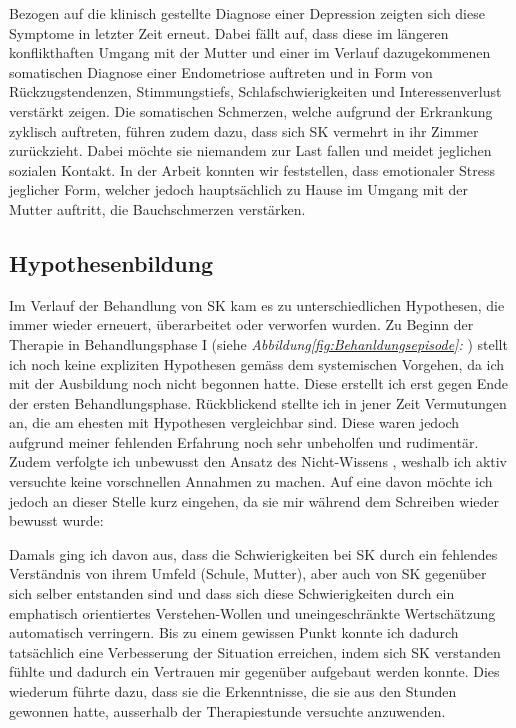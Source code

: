  Bezogen auf die klinisch gestellte Diagnose einer Depression zeigten sich diese Symptome in letzter Zeit erneut. Dabei fällt auf, dass diese im längeren konflikthaften Umgang mit der Mutter und einer im Verlauf dazugekommenen somatischen Diagnose einer Endometriose auftreten und in  Form von Rückzugstendenzen, Stimmungstiefs, Schlafschwierigkeiten und Interessenverlust verstärkt zeigen. Die somatischen Schmerzen, welche aufgrund der Erkrankung zyklisch auftreten, führen zudem dazu, dass sich SK vermehrt in ihr Zimmer zurückzieht. Dabei möchte sie niemandem zur Last fallen und meidet jeglichen sozialen Kontakt. In der Arbeit konnten wir feststellen, dass emotionaler Stress jeglicher Form, welcher jedoch hauptsächlich zu Hause im Umgang mit der Mutter auftritt, die Bauchschmerzen verstärken.
 
\subsection{Hypothesenbildung} 
Im Verlauf der Behandlung von SK kam es zu unterschiedlichen Hypothesen, die immer wieder erneuert, überarbeitet oder verworfen wurden. Zu Beginn der Therapie in Behandlungsphase I (siehe \textit{Abbildung\ref{fig:Behanldungsepisode}: }) stellt ich noch keine expliziten Hypothesen gemäss dem systemischen Vorgehen, da ich mit der Ausbildung noch nicht begonnen hatte. Diese erstellt ich erst gegen Ende der ersten Behandlungsphase. Rückblickend stellte ich in jener Zeit Vermutungen an, die am ehesten mit Hypothesen vergleichbar sind. Diese waren jedoch aufgrund meiner fehlenden Erfahrung noch sehr unbeholfen und rudimentär. Zudem verfolgte ich unbewusst den Ansatz des Nicht-Wissens \cite{Anderson1992}, weshalb ich aktiv versuchte keine vorschnellen Annahmen zu machen. Auf eine davon möchte ich jedoch an dieser Stelle kurz eingehen, da sie mir während dem Schreiben wieder bewusst wurde: 

Damals ging ich davon aus, dass die Schwierigkeiten bei SK durch ein fehlendes Verständnis von ihrem Umfeld (Schule, Mutter), aber auch  von SK gegenüber sich selber entstanden sind und dass sich diese Schwierigkeiten durch ein emphatisch orientiertes Verstehen-Wollen und uneingeschränkte Wertschätzung automatisch verringern. Bis zu einem gewissen Punkt konnte ich dadurch tatsächlich eine Verbesserung der Situation erreichen, indem sich SK verstanden fühlte und dadurch ein Vertrauen mir gegenüber aufgebaut werden konnte. Dies wiederum führte dazu, dass sie die Erkenntnisse, die sie aus den Stunden gewonnen hatte, ausserhalb der Therapiestunde versuchte anzuwenden.

